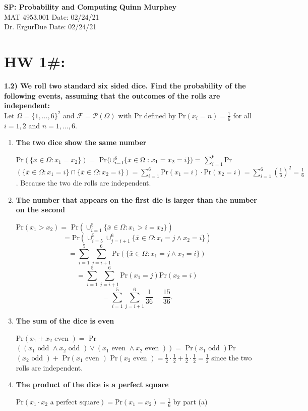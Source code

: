 \documentclass[letterpaper, 12pt]{article}
\begin{document}
\noindent
\large\textbf{SP: Probability and Computing} \hfill \textbf{Quinn Murphey} \\
\normalsize MAT 4953.001 \hfill Date: 02/24/21\\
Dr. Ergur\hfill Due Date: 02/24/21\\
\noindent\makebox[\linewidth]{\rule{\paperwidth}{0.4pt}}


\section*{HW 1\#:}
	\textbf{1.2) We roll two standard six sided dice. Find the probability of the following events, assuming that the outcomes of the rolls are independent:} \\
		Let $\Omega = \{1, \dots, 6\}^2$ and $\mathcal{F} = \mathcal{P}(\Omega)$ with Pr defined by Pr$(x_i = n) = \frac{1}{6}$ for all $i = 1,2$ and $n = 1,\dots,6$.
	\begin{enumerate}
		\item \textbf{The two dice show the same number}

			Pr$(\{\bar{x}\in\Omega : x_1 = x_2\}) = $ Pr$(\cup_{i=1}^6\{\bar{x}\in\Omega : x_1 = x_2 = i\}) \\ = $ $\sum_{i=1}^6$Pr$(\{\bar{x}\in\Omega : x_1=i\} \cap \{\bar{x}\in\Omega : x_2 = i\}) = \sum_{i=1}^6\text{Pr}(x_1=i)\cdot\text{Pr}(x_2=i) = \sum_{i=1}^6 (\frac{1}{6})^2 = \frac{1}{6}$.
			Because the two die rolls are independent.

		\item \textbf{The number that appears on the first die is larger than the number on the second}
			
			Pr$(x_1 > x_2) = $ Pr$(\cup_{i=1}^5\{\bar{x}\in\Omega : x_1 > i = x_2\}) $
			$$= \text{Pr}(\cup_{i=5}^5\cup_{j=i+1}^6\{\bar{x}\in\Omega : x_i = j \land x_2=i\}) $$
			$$= \sum_{i=1}^5\sum_{j=i+1}^6\text{Pr}(\{\bar{x}\in\Omega : x_1 = j \land x_2 = i\}) $$
			$$= \sum_{i=1}^5\sum_{j=i+1}^6\text{Pr}(x_1 = j)\text{Pr}(x_2 = i) $$
			$$=\sum_{i=1}^5\sum_{j=i+1}^6\frac{1}{36} = \frac{15}{36}. $$
			
		\item \textbf{The sum of the dice is even}

			Pr$(x_1 + x_2 \text{ even }) =$ Pr$((x_1 \text{ odd } \land x_2 \text{ odd }) \lor (x_1 \text{ even } \land x_2 \text{ even })) = $ Pr$(x_1 \text{ odd })$Pr$(x_2 \text{ odd }) + $ Pr$(x_1 \text{ even } )$ Pr$(x_2 \text{ even }) = \frac{1}{2}\cdot\frac{1}{2} + \frac{1}{2}\cdot\frac{1}{2} = \frac{1}{2}$ since the two rolls are independent.
			
		\item \textbf{The product of the dice is a perfect square}

			Pr$(x_1\cdot x_2\text{ a perfect square}) = \text{Pr}(x_1 = x_2) = \frac{1}{6}$ by part (a)
	\end{enumerate}
\end{document}
